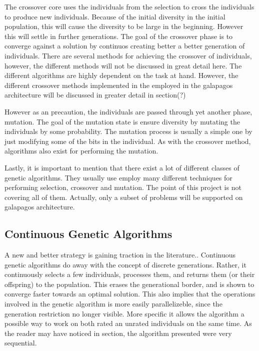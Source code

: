 The crossover core uses the individuals from the selection to cross the individuals to produce new individuals. Because of the initial diversity in the initial population, this will cause the diversity to be large in the beginning. However this will settle in further generations. The goal of the crossover phase is to converge against a solution by continuos creating better a better generation of individuals. There are several methods for achieving the crossover of individuals, however, the different methods will not be discussed in great detail here. The different algorithms are highly dependent on the task at hand. However, the different crossover methods implemented in the employed in the galapagos architecture will be discussed in greater detail in section(?) 

However as an precaution, the individuals are passed through yet another phase, mutation. The goal of the mutation state is ensure diversity by mutating the individuals by some probability. The mutation process is usually a simple one by just modifying some of the bits in the individual. As with the crossover method, algorithms also exist for performing the mutation. 

Lastly, it is important to mention that there exist a lot of different classes of genetic algorithms. They usually use employ many different techniques for performing selection, crossover and mutation. The point of this project is not covering all of them. Actually, only a subset of problems will be supported on galapagos architecture. 




\subsection{Continuous Genetic Algorithms}

A new and better strategy is gaining traction in the literature..
Continuous genetic algorithms do away with the concept of discrete generations.
Rather, it continuously selects a few individuals, processes them, and returns them (or their offspring) to the population.
This erases the generational border, and is shown  to converge faster towards an optimal solution. This also implies that the operations involved in the genetic algorithm is  more easily parallelizeble, since the generation restriction no longer visible. More specific it allows the algorithm a possible way to work on both rated an unrated individuals on the same time. As the reader may have noticed in section, the algorithm presented were very sequential. 

